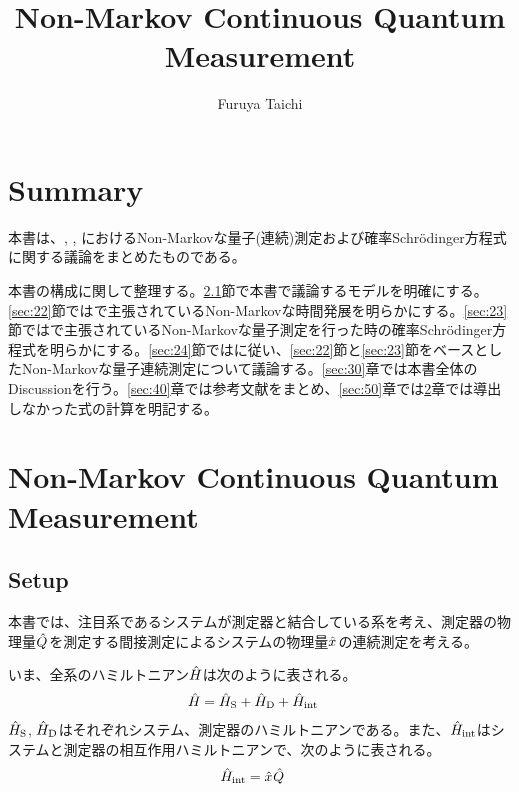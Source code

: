 \documentclass[10pt, a4paper]{jsarticle}
\begin{document}
\title{Non-Markov Continuous Quantum Measurement}
\author{Furuya Taichi}
\date{}
\maketitle

\section{Summary}
\label{sec:10}
本書は、\cite{diosi2008retarted}, \cite{diosi2008retarted}, \cite{gambetta2002non-markov}におけるNon-Markovな量子(連続)測定および確率Schr\"{o}dinger方程式に関する議論をまとめたものである。

本書の構成に関して整理する。\ref{sec:21}節で本書で議論するモデルを明確にする。\ref{sec:22}節では\cite{diosi2008retarted}で主張されているNon-Markovな時間発展を明らかにする。\ref{sec:23}節では\cite{gambetta2002non-markov}で主張されているNon-Markovな量子測定を行った時の確率Schr\"{o}dinger方程式を明らかにする。\ref{sec:24}節では\cite{diosi2008retarted}に従い、\ref{sec:22}節と\ref{sec:23}節をベースとしたNon-Markovな量子連続測定について議論する。\ref{sec:30}章では本書全体のDiscussionを行う。\ref{sec:40}章では参考文献をまとめ、\ref{sec:50}章では\ref{sec:20}章では導出しなかった式の計算を明記する。

\section{Non-Markov Continuous Quantum Measurement}
\label{sec:20}

\subsection{Setup}
\label{sec:21}

本書では、注目系であるシステムが測定器と結合している系を考え、測定器の物理量$\hat{Q}_{}$を測定する間接測定によるシステムの物理量$\hat{x}_{}$の連続測定を考える。

いま、全系のハミルトニアン$\hat{H}_{\rm }$は次のように表される。
\begin{equation}
\begin{split}
\label{eq:21}
	\hat{H}_{\rm } &= \hat{H}_{\rm S} + \hat{H}_{\rm D} + \hat{H}_{\rm int}
\end{split}
\end{equation}
$\hat{H}_{\rm S}$, $\hat{H}_{\rm D}$はそれぞれシステム、測定器のハミルトニアンである。また、$\hat{H}_{\rm int}$はシステムと測定器の相互作用ハミルトニアンで、次のように表される。
\begin{equation}
\begin{split}
\label{eq:22}
	\hat{H}_{\rm int} &= \hat{x}_{} \hat{Q}_{}
\end{split}
\end{equation}
\end{document}
